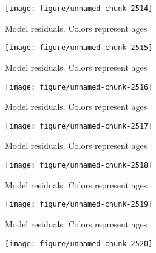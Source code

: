 \documentclass[a4paper]{article}\usepackage{graphicx, color}
\makeatletter
\def\maxwidth{ %
  \ifdim\Gin@nat@width>\linewidth
    \linewidth
  \else
    \Gin@nat@width
  \fi
}
\newenvironment{knitrout}{}{} %
\makeatother
\begin{document}
\begin{knitrout}
\begin{figure}[H]
{\centering \texttt{[image: figure/unnamed-chunk-2514]} 

}

\caption[Model residuals]{Model residuals. Colors represent ages\label{fig:unnamed-chunk-2514}}
\end{figure}
\begin{figure}[H]


{\centering \texttt{[image: figure/unnamed-chunk-2515]} 

}

\caption[Model residuals]{Model residuals. Colors represent ages\label{fig:unnamed-chunk-2515}}
\end{figure}
\begin{figure}[H]


{\centering \texttt{[image: figure/unnamed-chunk-2516]} 

}

\caption[Model residuals]{Model residuals. Colors represent ages\label{fig:unnamed-chunk-2516}}
\end{figure}
\begin{figure}[H]


{\centering \texttt{[image: figure/unnamed-chunk-2517]} 

}

\caption[Model residuals]{Model residuals. Colors represent ages\label{fig:unnamed-chunk-2517}}
\end{figure}
\begin{figure}[H]


{\centering \texttt{[image: figure/unnamed-chunk-2518]} 

}

\caption[Model residuals]{Model residuals. Colors represent ages\label{fig:unnamed-chunk-2518}}
\end{figure}
\begin{figure}[H]


{\centering \texttt{[image: figure/unnamed-chunk-2519]} 

}

\caption[Model residuals]{Model residuals. Colors represent ages\label{fig:unnamed-chunk-2519}}
\end{figure}
\begin{figure}[H]


{\centering \texttt{[image: figure/unnamed-chunk-2520]} 

}


\end{figure}
\end{knitrout}
\end{document}
